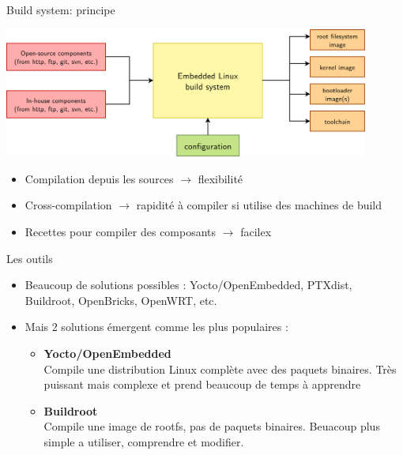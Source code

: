 \begin{frame}{Build system: principe}
  \begin{center}
    \includegraphics[width=0.9\textwidth]{graphics/buildsystem-principle.pdf}
  \end{center}
  \begin{itemize}
  \item Compilation depuis les sources $\rightarrow$ flexibilité
  \item Cross-compilation $\rightarrow$ rapidité à compiler si utilise des machines de build
  \item Recettes pour compiler des composants $\rightarrow$ facilex
  \end{itemize}
\end{frame}

\begin{frame}{Les outils}
  \begin{itemize}
  \item Beaucoup de solutions possibles : Yocto/OpenEmbedded, PTXdist,
    Buildroot, OpenBricks, OpenWRT, etc.
  \item Mais 2 solutions émergent comme les plus populaires :
    \begin{itemize}
    \item {\bf Yocto/OpenEmbedded}\\Compile une distribution Linux complète avec des paquets binaires. Très puissant mais complexe et prend beaucoup de temps à apprendre
    \item {\bf Buildroot}\\Compile une image de rootfs, pas de paquets binaires. Beuacoup plus simple a utiliser, comprendre et modifier.
    \end{itemize}
  \end{itemize}
\end{frame}
